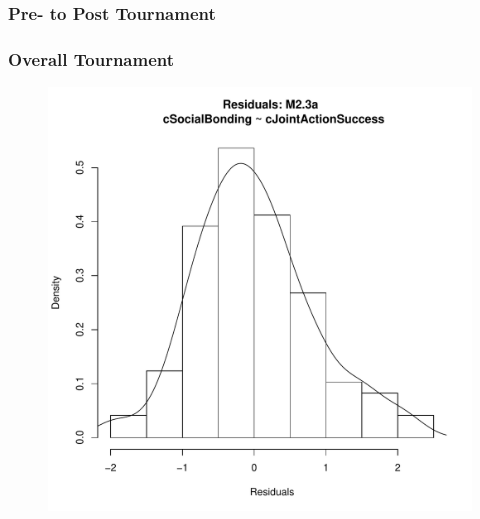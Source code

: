       \subsubsection{Pre- to Post Tournament\label{app8:MLM23a}}
          


      \subsubsection{Overall Tournament}

      \begin{figure}[htbp]
        \includegraphics[scale =.4]{images/MLM23aHist.pdf}

\end{figure}
